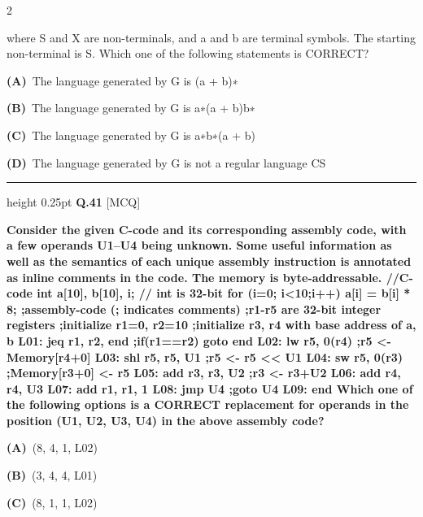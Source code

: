 \documentclass[a4paper,10pt,twoside]{article}
\begin{document}
\begin{multicols}{2}
{where S and X are non-terminals, and a and b are terminal symbols. The starting
non-terminal is S.
Which one of the following statements is CORRECT? \par}
\par\vspace{2pt}\noindent
\textbf{(A)}~The language generated by G is (a + b)∗\par\vspace{2pt}\noindent
\textbf{(B)}~The language generated by G is a∗(a + b)b∗\par\vspace{2pt}\noindent
\textbf{(C)}~The language generated by G is a∗b∗(a + b)\par\vspace{2pt}\noindent
\textbf{(D)}~The language generated by G is not a regular language \newline CS
\par\vspace{6pt}\hrule height 0.25pt\vspace{6pt}
\noindent\textbf{Q.41} \hfill {\footnotesize\textsf{[MCQ]}}
\par\vspace{2pt}
{\bfseries Consider the given C-code and its corresponding assembly code, with a few
operands U1--U4 being unknown. Some useful information as well as the semantics
of each unique assembly instruction is annotated as inline comments in the code.
The memory is byte-addressable.
//C-code
int a[10], b[10], i;
// int is 32-bit
for (i=0; i<10;i++)
a[i] = b[i] * 8;
;assembly-code (; indicates comments)
;r1-r5 are 32-bit integer registers
;initialize r1=0, r2=10
;initialize r3, r4 with base address of a, b
L01: jeq r1, r2, end
;if(r1==r2) goto end
L02: lw
r5, 0(r4)
;r5 <- Memory[r4+0]
L03: shl r5, r5, U1
;r5 <- r5 << U1
L04: sw
r5, 0(r3)
;Memory[r3+0] <- r5
L05: add r3, r3, U2
;r3 <- r3+U2
L06: add r4, r4, U3
L07: add r1, r1, 1
L08: jmp U4
;goto U4
L09: end
Which one of the following options is a CORRECT replacement for operands in
the position (U1, U2, U3, U4) in the above assembly code? \par}
\par\vspace{2pt}\noindent
\textbf{(A)}~(8, 4, 1, L02)\par\vspace{2pt}\noindent
\textbf{(B)}~(3, 4, 4, L01)\par\vspace{2pt}\noindent
\textbf{(C)}~(8, 1, 1, L02)\par\vspace{2pt}\noindent

\end{multicols}
\end{document}
